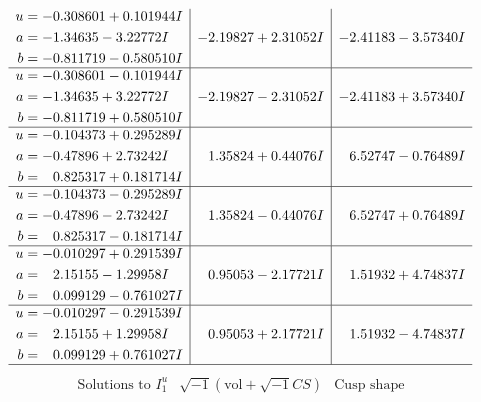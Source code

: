 \documentclass[1p]{elsarticle_modified}
\theoremstyle{definition}
\newcommand{\I}{\sqrt{-1}}
\begin{document}
$$\begin{array}{c|c|c}
\begin{aligned}
u &= -0.308601 + 0.101944 I \\
a &= -1.34635 - 3.22772 I \\
b &= -0.811719 - 0.580510 I\end{aligned}
 & -2.19827 + 2.31052 I & -2.41183 - 3.57340 I \\ \hline\begin{aligned}
u &= -0.308601 - 0.101944 I \\
a &= -1.34635 + 3.22772 I \\
b &= -0.811719 + 0.580510 I\end{aligned}
 & -2.19827 - 2.31052 I & -2.41183 + 3.57340 I \\ \hline\begin{aligned}
u &= -0.104373 + 0.295289 I \\
a &= -0.47896 + 2.73242 I \\
b &= \phantom{-}0.825317 + 0.181714 I\end{aligned}
 & \phantom{-}1.35824 + 0.44076 I & \phantom{-}6.52747 - 0.76489 I \\ \hline\begin{aligned}
u &= -0.104373 - 0.295289 I \\
a &= -0.47896 - 2.73242 I \\
b &= \phantom{-}0.825317 - 0.181714 I\end{aligned}
 & \phantom{-}1.35824 - 0.44076 I & \phantom{-}6.52747 + 0.76489 I \\ \hline\begin{aligned}
u &= -0.010297 + 0.291539 I \\
a &= \phantom{-}2.15155 - 1.29958 I \\
b &= \phantom{-}0.099129 - 0.761027 I\end{aligned}
 & \phantom{-}0.95053 - 2.17721 I & \phantom{-}1.51932 + 4.74837 I \\ \hline\begin{aligned}
u &= -0.010297 - 0.291539 I \\
a &= \phantom{-}2.15155 + 1.29958 I \\
b &= \phantom{-}0.099129 + 0.761027 I\end{aligned}
 & \phantom{-}0.95053 + 2.17721 I & \phantom{-}1.51932 - 4.74837 I\\
 \hline 
 \end{array}$$\newpage$$\begin{array}{c|c|c}  
\text{Solutions to }I^u_{1}& \I (\text{vol} + \sqrt{-1}CS) & \text{Cusp shape}\\
 \hline 
\begin{aligned}

\end{aligned}
\end{array}$$
\end{document}
